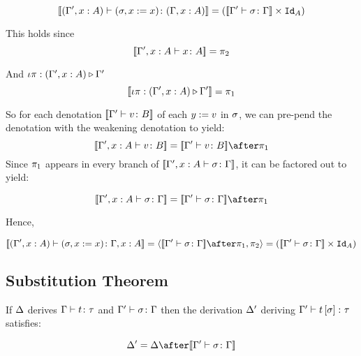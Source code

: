{    \begin{equation}
        {\bf [\![}(\Gamma', x:A) \vdash (\sigma, x:= x) \colon (\Gamma, x: A){\bf ]\!]} = ({\bf [\![}\Gamma' \vdash \sigma \colon \Gamma{\bf ]\!]}\times \texttt{Id}_{A})
    \end{equation}

    This holds since 
    \begin{equation}
        {\bf [\![}\Gamma', x:A \vdash x \colon A{\bf ]\!]} = \pi_2
    \end{equation}

    And $\iota\pi : (\Gamma',x:A) \triangleright \Gamma'$
    \begin{equation}
        {\bf [\![}\iota\pi : (\Gamma',x:A) \triangleright \Gamma'{\bf ]\!]} = \pi_1
    \end{equation}

    So for each denotation ${\bf [\![}\Gamma' \vdash v \colon B{\bf ]\!]}$ of each $y:= v$ in $\sigma$, we can pre-pend the denotation with the weakening denotation to yield: 
    \begin{equation}
        \deno{\typerelation{\G',x:A}{v}{B}} = \deno{\typerelation{\G'}{v}{B}}\after\p
    \end{equation}
    Since $\pi_1$ appears in every branch of ${\bf [\![}\Gamma', x:A \vdash \sigma \colon \Gamma{\bf ]\!]}$, it can be factored out to yield:

    \begin{equation}
        \deno{\typerelation{\G', x:A}{\si}{\G}} = \deno{\typerelation{\G'}{\si}{\G}}\after\p
    \end{equation}

    Hence,

    \begin{equation}
        \deno{\typerelation{(\G', x:A)}{(\si, x\setto x)}{\gax}} = \pr{\deno{\typerelation{\G'}{\si}{\G}}\after\p}{\pp} = (\deno{\typerelation{\G'}{\si}{\G}}\times \Id{A})
    \end{equation}
    \subsection{Substitution Theorem}

    If $\Delta$ derives $\Gamma \vdash t \colon \tau$ and $\Gamma' \vdash \sigma \colon \Gamma$ then the derivation $\Delta'$ deriving $\Gamma' \vdash t\left[\sigma\right] \colon \tau$ satisfies:

    \begin{equation}
        \D' = \D \after\deno{\typerelation{\G'}{\si}{\G}}
    \end{equation}

}
